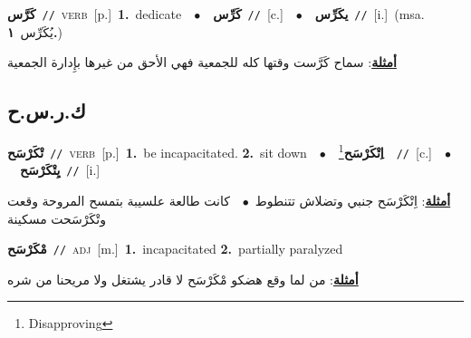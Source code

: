 \documentclass[10pt,a4paper,twoside]{article} %
\begin{document}
\begin{multicols}{2}
{\setlength\topsep{0pt}\textbf{\foreignlanguage{arabic}{كَرَّس}}\ {\color{gray}\texttt{//}\color{black}}\ \textsc{verb}\ [p.]\ \textbf{1.}~dedicate\ \ $\bullet$\ \ \setlength\topsep{0pt}\textbf{\foreignlanguage{arabic}{كَرِّس}}\ {\color{gray}\texttt{//}\color{black}}\ [c.]\ \ $\bullet$\ \ \setlength\topsep{0pt}\textbf{\foreignlanguage{arabic}{يكَرِّس}}\ {\color{gray}\texttt{//}\color{black}}\ [i.]\ \color{gray}(msa. \foreignlanguage{arabic}{يُكَرِّس}~\foreignlanguage{arabic}{\textbf{١.}})\color{black}\  \begin{flushright}\color{gray}\foreignlanguage{arabic}{\textbf{\underline{\foreignlanguage{arabic}{أمثلة}}}: سماح كَرَّست وقتها كله للجمعية فهي الأحق من غيرها بإِدارة الجمعية}\end{flushright}\color{black}} \vspace{2mm}

\vspace{-3mm}
\subsection*{\color{blue}\foreignlanguage{arabic}{ك.ر.س.ح}\color{blue}{}} 

{\setlength\topsep{0pt}\textbf{\foreignlanguage{arabic}{تْكَرْسَح}}\ {\color{gray}\texttt{//}\color{black}}\ \textsc{verb}\ [p.]\ \textbf{1.}~be incapacitated.  \textbf{2.}~sit down\ \ $\bullet$\ \ \setlength\topsep{0pt}\textbf{\foreignlanguage{arabic}{اِتْكَرْسَح}}\footnote{Disapproving}\ \ {\color{gray}\texttt{//}\color{black}}\ [c.]\ \ $\bullet$\ \ \setlength\topsep{0pt}\textbf{\foreignlanguage{arabic}{يِتْكَرْسَح}}\ {\color{gray}\texttt{//}\color{black}}\ [i.]\  \begin{flushright}\color{gray}\foreignlanguage{arabic}{\textbf{\underline{\foreignlanguage{arabic}{أمثلة}}}: اِتْكَرْسَح جنبي وتضلاش تتنطوط\ $\bullet$\ \  كانت طالعة علسيبة بتمسح المروحة وقعت وتْكَرْسَحت مسكينة}\end{flushright}\color{black}} \vspace{2mm}

{\setlength\topsep{0pt}\textbf{\foreignlanguage{arabic}{مْكَرْسَح}}\ {\color{gray}\texttt{//}\color{black}}\ \textsc{adj}\ [m.]\ \textbf{1.}~incapacitated  \textbf{2.}~partially paralyzed\  \begin{flushright}\color{gray}\foreignlanguage{arabic}{\textbf{\underline{\foreignlanguage{arabic}{أمثلة}}}: من لما وقع هضكو مْكَرْسَح لا قادر يشتغل ولا مريحنا من شره}\end{flushright}\color{black}} \vspace{2mm}


\end{multicols}
\end{document}
